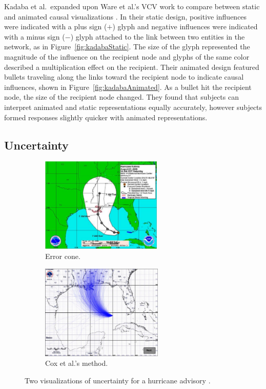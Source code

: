 Kadaba et al.\ expanded upon Ware et al.'s VCV work to compare between static and animated causal visualizations \cite{kadaba2007}.  In their static design, positive influences were indicated with a plus sign ($+$) glyph and negative influences were indicated with a minus sign ($-$) glyph attached to the link between two entities in the network, as in Figure~\ref{fig:kadabaStatic}.  The size of the glyph represented the magnitude of the influence on the recipient node and glyphs of the same color described a multiplication effect on the recipient.   Their animated design featured bullets traveling along the links toward the recipient node to indicate causal influences, shown in Figure~\ref{fig:kadabaAnimated}.  As a bullet hit the recipient node, the size of the recipient node changed.  They found that subjects can interpret animated and static representations equally accurately, however subjects formed responses slightly quicker with animated representations.

\subsection{Uncertainty}

\begin{figure}
\centering
	\begin{subfigure}[b]{0.45\textwidth}
		\centering
		\includegraphics[height=4.5cm]{figures/eps/uncertainty_cone.eps}
		\caption{Error cone.}
		\label{fig:uncertaintyCone}
	\end{subfigure}	
	\begin{subfigure}[b]{0.45\textwidth}
		\centering
		\includegraphics[height=4.5cm]{figures/eps/uncertainty_house.eps}
		\caption{Cox et al.'s method.}
		\label{fig:uncertaintyHouse}
	\end{subfigure}
	\caption{Two visualizations of uncertainty for a hurricane advisory \cite{cox2013}.}
	\label{fig:uncertaintyAlternatives}
\end{figure}

